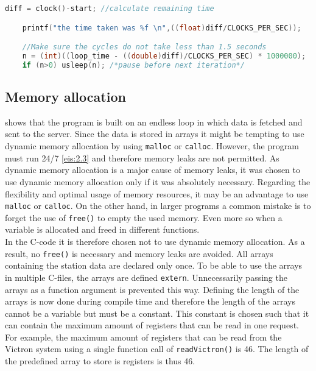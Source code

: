 \scriptsize
\begin{lstlisting}[language=C,caption={A cause of small desynchronization},label={desync}]
	diff = clock()-start; //calculate remaining time

	printf("the time taken was %f \n",((float)diff/CLOCKS_PER_SEC));

    //Make sure the cycles do not take less than 1.5 seconds
	n = (int)((loop_time - ((double)diff)/CLOCKS_PER_SEC) * 1000000);
	if (n>0) usleep(n); /*pause before next iteration*/
\end{lstlisting}
\normalsize

\subsection{Memory allocation}\label{sec:malloc}
 shows that the program is built on an endless loop in which data is fetched and sent to the server. Since the data is stored in arrays it might be tempting to use dynamic memory allocation by using \verb|malloc| or \verb|calloc|. However, the program must run 24/7 \ref{eis:2.3} and therefore memory leaks are not permitted. As dynamic memory allocation is a major cause of memory leaks, it was chosen to use dynamic memory allocation only if it was absolutely necessary. Regarding the flexibility and optimal usage of memory resources, it may be an advantage to use \verb|malloc| or \verb|calloc|. On the other hand, in larger programs a common mistake is to forget the use of \verb|free()| to empty the used memory. Even more so when a variable is allocated and freed in different functions.\\

In the C-code it is therefore chosen not to use dynamic memory allocation. As a result, no \verb|free()| is necessary and memory leaks are avoided. All arrays containing the station data are declared only once. To be able to use the arrays in multiple C-files, the arrays are defined \verb|extern|. Unnecessarily passing the arrays as a function argument is prevented this way. Defining the length of the arrays is now done during compile time and therefore the length of the arrays cannot be a variable but must be a constant. This constant is chosen such that it can contain the maximum amount of registers that can be read in one request. For example, the maximum amount of registers that can be read from the Victron system using a single function call of \verb|readVictron()| is 46. The length of the predefined array to store is registers is thus 46. 


